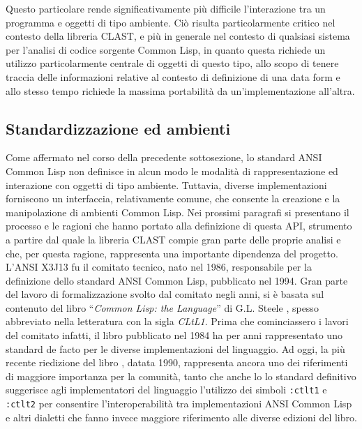 Questo particolare rende significativamente più difficile l'interazione tra un
programma e oggetti di tipo ambiente. Ciò risulta particolarmente critico nel
contesto della libreria CLAST, e più in generale nel contesto di qualsiasi
sistema per l'analisi di codice sorgente Common Lisp, in quanto questa richiede
un utilizzo particolarmente centrale di oggetti di questo tipo, allo scopo di
tenere traccia delle informazioni relative al contesto di definizione di una
data form e allo stesso tempo richiede la massima portabilità da
un'implementazione all'altra.

\subsection{Standardizzazione ed ambienti}

Come affermato nel corso della precedente sottosezione, lo standard ANSI Common
Lisp non definisce in alcun modo le modalità di rappresentazione ed interazione
con oggetti di tipo ambiente. Tuttavia, diverse implementazioni forniscono un
interfaccia, relativamente comune, che consente la creazione e la manipolazione
di ambienti Common Lisp. Nei prossimi paragrafi si presentano il processo e le
ragioni che hanno portato alla definizione di questa API, strumento a partire
dal quale la libreria CLAST compie gran parte delle proprie analisi e che, per
questa ragione, rappresenta una importante dipendenza del progetto.\\

L’ANSI X3J13 fu il comitato tecnico, nato nel 1986, responsabile per la
definizione dello standard ANSI Common Lisp, pubblicato nel 1994. Gran parte del
lavoro di formalizzazione svolto dal comitato negli anni, si è basata sul
contenuto del libro \enquote{\textit{Common Lisp: the Language}} di G.L. Steele
\cite{steele1984common}, spesso abbreviato nella letteratura con la sigla
\textit{CLtL1}. Prima che cominciassero i lavori del comitato infatti, il libro
pubblicato nel 1984 ha per anni rappresentato uno standard de facto per le
diverse implementazioni del linguaggio. Ad oggi, la più recente riedizione del
libro \cite{steele1990common}, datata 1990, rappresenta ancora uno dei
riferimenti di maggiore importanza per la comunità, tanto che anche lo lo
standard definitivo suggerisce agli implementatori del linguaggio l’utilizzo dei
simboli \texttt{:ctlt1} e \texttt{:ctlt2} per consentire l’interoperabilità tra
implementazioni ANSI Common Lisp e altri dialetti che fanno invece maggiore
riferimento alle diverse edizioni del libro.\\

